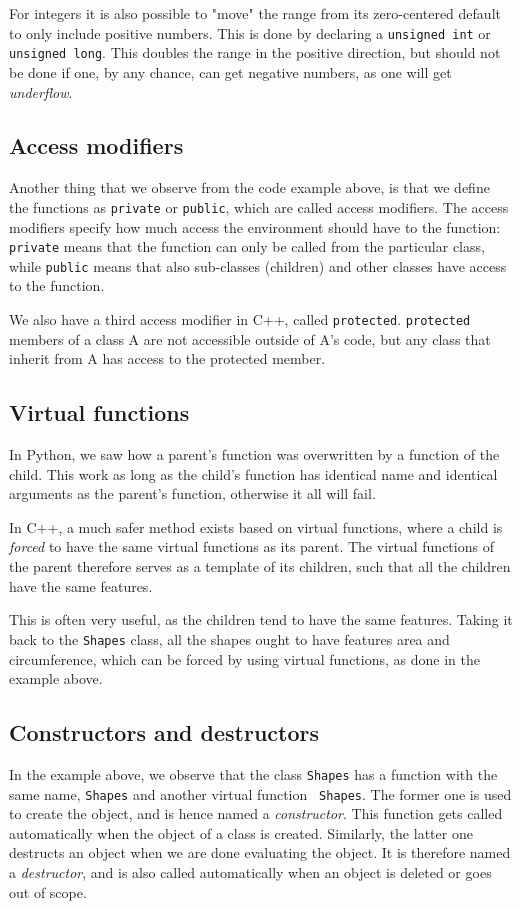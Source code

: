 For integers it is also possible to "move" the range from its zero-centered default to only include positive numbers. This is done by declaring a \texttt{unsigned int} or \texttt{unsigned long}. This doubles the range in the positive direction, but should not be done if one, by any chance, can get negative numbers, as one will get \textit{underflow}.  

\subsection{Access modifiers}
Another thing that we observe from the code example above, is that we define the functions as \texttt{private} or \texttt{public}, which are called access modifiers. The access modifiers specify how much access the environment should have to the function: \texttt{private} means that the function can only be called from the particular class, while \texttt{public} means that also sub-classes (children) and other classes have access to the function. 

We also have a third access modifier in C++, called \texttt{protected}. \texttt{protected} members of a class A are not accessible outside of A's code, but any class that inherit from A has access to the protected member. 

\subsection{Virtual functions}
In Python, we saw how a parent's function was overwritten by a function of the child. This work as long as the child's function has identical name and identical arguments as the parent's function, otherwise it all will fail.

In C++, a much safer method exists based on virtual functions, where a child is \textit{forced} to have the same virtual functions as its parent. The virtual functions of the parent therefore serves as a template of its children, such that all the children have the same features. 

This is often very useful, as the children tend to have the same features. Taking it back to the \texttt{Shapes} class, all the shapes ought to have features area and circumference, which can be forced by using virtual functions, as done in the example above. 

\subsection{Constructors and destructors}
In the example above, we observe that the class \texttt{Shapes} has a function with the same name, \texttt{Shapes} and another virtual function \texttt{~Shapes}. The former one is used to create the object, and is hence named a \textit{constructor}. This function gets called automatically when the object of a class is created. Similarly, the latter one destructs an object when we are done evaluating the object. It is therefore named a \textit{destructor}, and is also called automatically when an object is deleted or goes out of scope.

